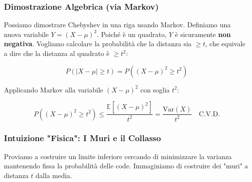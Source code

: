 \subsubsection{Dimostrazione Algebrica (via Markov)}
Possiamo dimostrare Chebyshev in una riga usando Markov.
Definiamo una nuova variabile $Y = (X - \mu)^2$. Poiché è un quadrato, $Y$ è sicuramente \textbf{non negativa}.
Vogliamo calcolare la probabilità che la distanza sia $\ge t$, che equivale a dire che la distanza al quadrato è $\ge t^2$:

\[
P(|X - \mu| \ge t) = P((X - \mu)^2 \ge t^2)
\]

Applicando Markov alla variabile $(X-\mu)^2$ con soglia $t^2$:

\[
P((X - \mu)^2 \ge t^2) \le \frac{\mathbb{E}[(X - \mu)^2]}{t^2} = \frac{\text{Var}(X)}{t^2} \quad \text{C.V.D.}
\]

\subsubsection{Intuizione "Fisica": I Muri e il Collasso}
Proviamo a costruire un limite inferiore cercando di minimizzare la varianza mantenendo fissa la probabilità delle code.
Immaginiamo di costruire dei "muri" a distanza $t$ dalla media.

